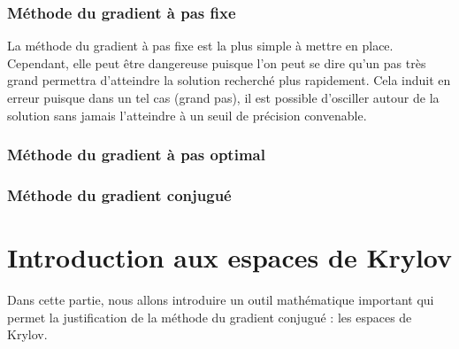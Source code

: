\subsubsection{Méthode du gradient à pas fixe}
La méthode du gradient à pas fixe est la plus simple à mettre en place. Cependant, elle peut être dangereuse puisque l'on peut se dire qu'un pas très grand permettra d'atteindre la solution recherché plus rapidement. Cela induit en erreur puisque dans un tel cas (grand pas), il est possible d'osciller autour de la solution sans jamais l'atteindre à un seuil de précision convenable.

\subsubsection{Méthode du gradient à pas optimal}
\subsubsection{Méthode du gradient conjugué}
\section{Introduction aux espaces de Krylov}
Dans cette partie, nous allons introduire un outil mathématique important qui permet la justification de la méthode du gradient conjugué : les espaces de Krylov. 
